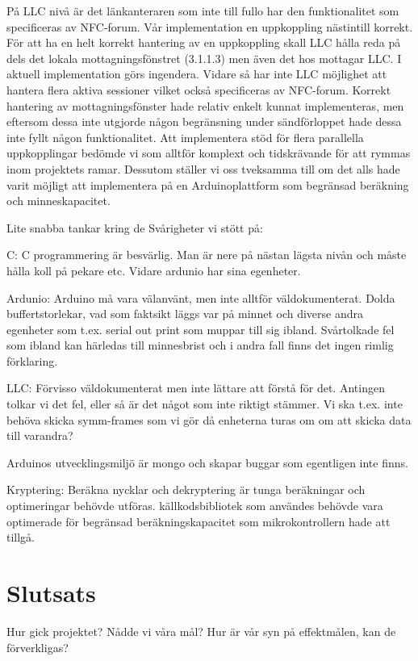 \documentclass[11pt]{article}
\begin{document}
På LLC nivå är det länkanteraren som inte till fullo har den funktionalitet som specificeras av NFC-forum. Vår implementation en uppkoppling nästintill korrekt. För att ha en helt korrekt hantering av en uppkoppling skall LLC hålla reda på dels det lokala mottagningsfönstret (3.1.1.3) men även det hos mottagar LLC. I aktuell implementation görs ingendera. Vidare så har inte LLC möjlighet att hantera flera aktiva sessioner vilket också specificeras av NFC-forum. Korrekt hantering av mottagningsfönster hade relativ enkelt kunnat implementeras, men eftersom dessa inte utgjorde någon begränsning under sändförloppet hade dessa inte fyllt någon funktionalitet. Att implementera stöd för flera parallella uppkopplingar bedömde vi som alltför komplext och tidskrävande för att rymmas inom projektets ramar. Dessutom ställer vi oss tveksamma till om det alls hade varit möjligt att implementera på en Arduinoplattform som begränsad beräkning och minneskapacitet.

Lite snabba tankar kring de Svårigheter vi stött på:

C: C programmering är besvärlig. Man är nere på nästan lägsta nivån och måste hålla koll på pekare etc. Vidare ardunio har sina egenheter.

Ardunio: Arduino må vara välanvänt, men inte alltför väldokumenterat. Dolda buffertstorlekar, vad som faktsikt läggs var på minnet och diverse andra egenheter som t.ex. serial out print som muppar till sig ibland. Svårtolkade fel som ibland kan härledas till minnesbrist och i andra fall finns det ingen rimlig förklaring.

LLC: Förvisso väldokumenterat men inte lättare att förstå för det. Antingen tolkar vi det fel, eller så är det något som inte riktigt stämmer. Vi ska t.ex. inte behöva skicka symm-frames som vi gör då enheterna turas om om att skicka data till varandra?

Arduinos utvecklingsmiljö är mongo och skapar buggar som egentligen inte finns. 

Kryptering: Beräkna nycklar och dekryptering är tunga beräkningar och optimeringar behövde utföras. källkodsbibliotek som användes behövde vara optimerade för begränsad beräkningskapacitet som mikrokontrollern hade att tillgå.


\section{Slutsats}
Hur gick projektet? 
Nådde vi våra mål?
Hur är vår syn på effektmålen, kan de förverkligas?
\end{document}
